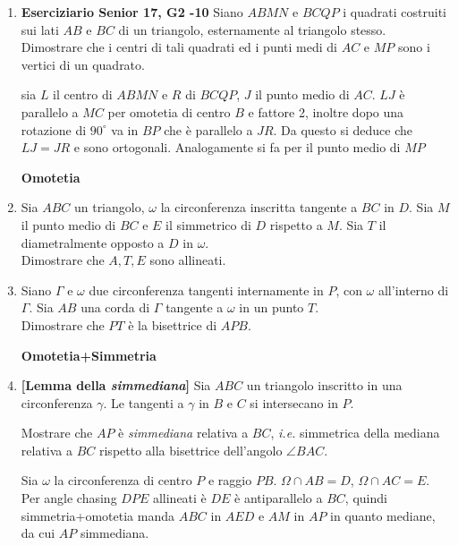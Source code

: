 \begin{enumerate}
      \item \textbf{Eserciziario Senior 17, G2 -10} Siano $ABMN$ e $BCQP$ i quadrati costruiti sui lati $AB$ e $BC$ di un triangolo, esternamente al triangolo stesso.
      Dimostrare che i centri di tali quadrati ed i punti medi di $AC$ e $MP$ sono i vertici di un quadrato.
      
      \begin{sol}sia $L$ il centro di $ABMN$ e $R$ di $BCQP$, $J$ il punto medio di $AC$. $LJ$ è parallelo a $MC$ per omotetia di centro $B$ e fattore 2, inoltre dopo una rotazione di $90^{\circ}$ va in $BP$ che è parallelo a $JR$. Da questo si deduce che $LJ=JR$ e sono ortogonali. Analogamente si fa per il punto medio di $MP$
      \end{sol}
      
       \textbf{Omotetia}
       
       	\item Sia $ABC$ un triangolo, $\omega$ la circonferenza inscritta tangente a $BC$ in $D$. Sia $M$ il punto medio di $BC$ e $E$ il simmetrico di $D$ rispetto a $M$. Sia $T$ il diametralmente opposto a $D$ in $\omega$. \\
       	Dimostrare che $A,T,E$ sono allineati.
       	
       	\item Siano $\Gamma$ e $\omega$ due circonferenza tangenti internamente in $P$, con $\omega$ all'interno di $\Gamma$. Sia $AB$ una corda di $\Gamma$ tangente a $\omega$ in un punto $T$.\\
       	Dimostrare che $PT$ è la bisettrice di $APB$.
       	
       	
       
       \textbf{Omotetia+Simmetria}
       
       \item  \textbf{[Lemma della \textit{simmediana}]} Sia $ABC$ un triangolo inscritto in una circonferenza $\gamma$. Le tangenti a $\gamma$ in $B$ e $C$ si intersecano in $P$.
    
       Mostrare che $AP$ è \textit{simmediana} relativa a $BC$, \textit{i.e.} simmetrica della mediana relativa a $BC$ rispetto alla bisettrice dell'angolo $\angle BAC$.   
       
       \begin{sol}
       Sia $\omega$ la circonferenza di centro $P$ e raggio $PB$. $\Omega\cap AB=D$, $\Omega\cap AC=E$. Per angle chasing $DPE$ allineati è $DE$ è antiparallelo a $BC$, quindi simmetria+omotetia manda $ABC$ in $AED$ e $AM$ in $AP$ in quanto mediane, da cui $AP$ simmediana.
       \end{sol}


\end{enumerate}
